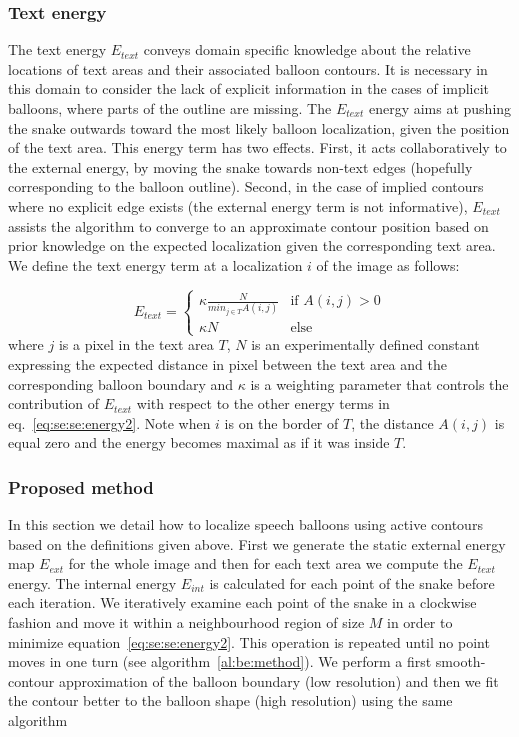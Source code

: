 \subsubsection{Text energy}
\label{sec:se:text_energie}

The text energy $E_{text}$ conveys domain specific knowledge about the relative locations of text areas and their associated balloon contours.
It is necessary in this domain to consider the lack of explicit information in the cases of implicit balloons, where parts of the outline are missing.
The $E_{text}$ energy aims at pushing the snake outwards toward the most likely balloon localization, given the position of the text area.
This energy term has two effects.
First, it acts collaboratively to the external energy, by moving the snake towards non-text edges (hopefully corresponding to the balloon outline).
Second, in the case of implied contours where no explicit edge exists (the external energy term is not informative), $E_{text}$ assists the algorithm to converge to an approximate contour position based on prior knowledge on the expected localization given the corresponding text area.
We define the text energy term at a localization $i$ of the image as follows:

\begin{equation}\label{eq:se:know}
E_{text} = \begin{cases} \kappa \frac{N}{min_{j \in T} A(i,j)} & \mbox{if } A(i,j) > 0 \\ \kappa N & \mbox{else} \end{cases}
\end{equation}
where $j$ is a pixel in the text area $T$, $N$ is an experimentally defined constant expressing the expected distance in pixel between the text area and the corresponding balloon boundary and $\kappa$ is a weighting parameter that controls the contribution of $E_{text}$ with respect to the other energy terms in eq.~\ref{eq:se:se:energy2}. Note when $i$ is on the border of $T$, the distance $A(i,j)$ is equal zero and the energy becomes maximal as if it was inside $T$.


\subsubsection{Proposed method}
\label{sec:proposed_method}

In this section we detail how to localize speech balloons using active contours based on the definitions given above. 
First we generate the static external energy map $E_{ext}$ for the whole image and then for each text area we compute the $E_{text}$ energy.
The internal energy $E_{int}$ is calculated for each point of the snake before each iteration.
We iteratively examine each point of the snake in a clockwise fashion and move it within a neighbourhood region of size $M$ in order to minimize equation~\ref{eq:se:se:energy2}.
This operation is repeated until no point moves in one turn (see algorithm~\ref{al:be:method}).
We perform a first smooth-contour approximation of the balloon boundary (low resolution) and then we fit the contour better to the balloon shape (high resolution) using the same algorithm

